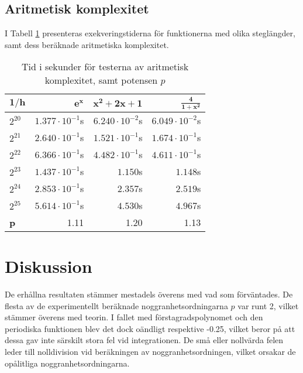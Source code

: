\documentclass[a4paper,titlepage]{article}
\begin{document}
\subsection{Aritmetisk komplexitet}

I Tabell \ref{tab:ar} presenteras exekveringstiderna för funktionerna med olika
steglängder, samt dess beräknade aritmetiska komplexitet.

\begin{table}[h]
    \centering
    \begin{tabular}{l | r | r | r}
        $\mathbf{1/h}$ & $\mathbf{e^x}$         & $\mathbf{x^2 + 2x + 1}$ & $\mathbf{\frac{4}{1 + x^2}}$ \\ \hline
        $2^{20}$       & $ 1.377 \cdot 10^{-1} $s & $ 6.240 \cdot 10^{-2} $s  & $ 6.049 \cdot 10^{-2}       $s \\
        $2^{21}$       & $ 2.640 \cdot 10^{-1} $s & $ 1.521 \cdot 10^{-1} $s  & $ 1.674 \cdot 10^{-1}       $s \\
        $2^{22}$       & $ 6.366 \cdot 10^{-1} $s & $ 4.482 \cdot 10^{-1} $s  & $ 4.611 \cdot 10^{-1}       $s \\
        $2^{23}$       & $ 1.437 \cdot 10^{-1} $s & $ 1.150              $s  & $ 1.148                    $s \\
        $2^{24}$       & $ 2.853 \cdot 10^{-1} $s & $ 2.357              $s  & $ 2.519                    $s \\
        $2^{25}$       & $ 5.614 \cdot 10^{-1} $s & $ 4.530              $s  & $ 4.967                    $s \\ \hline
        \textbf{p}     & 1.11                   & 1.20                      & 1.13  \\

    \end{tabular}
    \label{tab:ar}
    \caption{Tid i sekunder för testerna av aritmetisk komplexitet, samt
    potensen $p$}
\end{table}


\section{Diskussion}

De erhållna resultaten stämmer mestadels överens med vad som förväntades. De
flesta av de experimentellt beräknade noggranhetsordningarna $p$ var runt 2,
vilket stämmer överens med teorin. I fallet med förstagradspolynomet och den
periodiska funktionen blev det dock oändligt respektive -0.25, vilket beror
på att dessa gav inte särskilt stora fel vid integrationen. De små eller nollvärda felen leder till
nolldivision vid beräkningen av noggranhetsordningen, vilket orsakar de opålitliga
noggranhetsordningarna.
\end{document}
